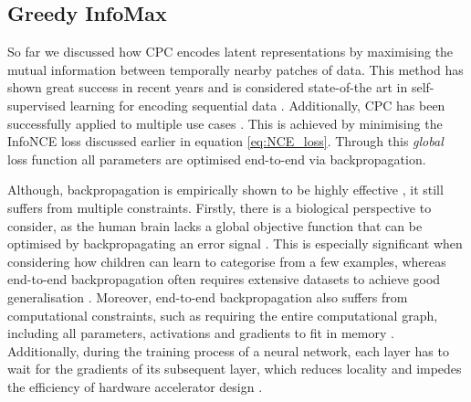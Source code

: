 			
	
	

\subsection{Greedy InfoMax}
	So far we discussed how CPC encodes latent representations by maximising the mutual information between temporally nearby patches of data. This method has shown great success in recent years and is considered state-of-the art in self-supervised learning for encoding sequential data \cite{stackeEvaluationContrastivePredictive2020}. Additionally, CPC has been successfully applied to multiple use cases \cite{stackeEvaluationContrastivePredictive2020, dehaanContrastivePredictiveCoding2021, luSemiSupervisedHistologyClassification2019, bhatiSegmentalContrastivePredictive2021b, deldariTimeSeriesChange2021, henaffDataEfficientImageRecognition2020}. This is achieved by minimising the InfoNCE loss discussed earlier in equation \ref{eq:NCE_loss}. Through this \textit{global} loss function all parameters are optimised end-to-end via backpropagation. 
	
	Although, backpropagation is empirically shown to be highly effective \cite{NIPS2012_c399862d, ioffeBatchNormalizationAccelerating2015}, it still suffers from multiple constraints. Firstly, there is a biological perspective to consider, as the human brain lacks a global objective function that can be optimised by backpropagating an error signal \cite{marblestoneIntegrationDeepLearning2016}. This is especially significant when considering how children can learn to categorise from a few examples, whereas end-to-end backpropagation often requires extensive datasets to achieve good generalisation \cite{lowePuttingEndEndtoEnd2020}. Moreover, end-to-end backpropagation also suffers from computational constraints, such as requiring the entire computational graph, including all parameters, activations and gradients to fit in memory \cite{lowePuttingEndEndtoEnd2020}. Additionally, during the training process of a neural network, each layer has to wait for the gradients of its subsequent layer, which reduces locality and impedes the efficiency of hardware accelerator design \cite{lowePuttingEndEndtoEnd2020}.
		
